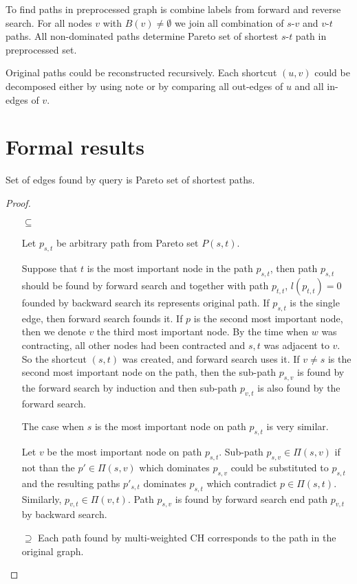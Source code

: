 To find paths in preprocessed graph is combine labels from forward and reverse search. 
For all nodes $v$ with $B(v) \ne \emptyset$ we join all combination of $s$-$v$ and $v$-$t$ paths. 
All non-dominated paths determine Pareto set of shortest $s$-$t$ path in preprocessed set.

Original paths could be reconstructed recursively.
Each shortcut $(u,v)$ could be decomposed either by using note or 
by comparing all out-edges of $u$ and all in-edges of $v$.




\section{Formal results}
\begin{lemma}
Set of edges found by query is Pareto set of shortest paths.
\end{lemma}
\begin{proof}
\begin{itemize}
\item[$\subseteq$] 

Let $p_{s,t}$ be arbitrary path from Pareto set $P(s,t)$. 

Suppose that $t$ is the most important node in the path $p_{s,t}$, 
then path $p_{s,t}$ should be found by forward search
and together with path $p_{t,t}$, $l(p_{t,t})=0$ 
founded by backward search its represents original path.
If $p_{s,t}$ is the single edge, then forward search founds it.
If $p$ is the second most important node, then we denote $v$ the
third most important node. 
By the time when $w$ was contracting, all other nodes had been contracted
and $s,t$ was adjacent to $v$. So the shortcut $(s,t)$ was created, and forward search uses it.
If $v \ne s$ is the second most important node on the path,
then the sub-path $p_{s,v}$ is found by the forward search by induction and
then sub-path $p_{v,t}$ is also found by the forward search.

The case when $s$ is the most important node on path $p_{s,t}$ is very similar. 

Let $v$ be the most important node on path $p_{s,t}$. 
Sub-path $p_{s,v} \in \Pi(s,v)$ 
if not than the $p' \in \Pi(s,v)$ which dominates $p_{s,v}$ could be substituted
to $p_{s,t}$ and the resulting paths $p'_{s,t}$ dominates $p_{s,t}$ which contradict
$p \in \Pi(s,t)$.
Similarly, $p_{v,t} \in \Pi(v,t) $. Path $p_{s,v}$ is found by forward search end path
$p_{v,t}$ by backward search.

\item[$\supseteq$] 
Each path found by multi-weighted CH corresponds to the path in the original graph. 

\end{itemize}
\end{proof}

